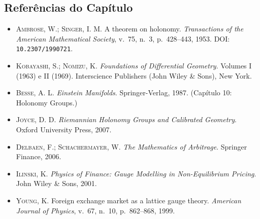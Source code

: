 \subsection*{Refer\^encias do Cap\'itulo}

\begin{itemize}
 \item \textsc{Ambrose, W.; Singer, I. M.} A theorem on holonomy. \emph{Transactions of the American Mathematical Society}, v.~75, n.~3, p.~428--443, 1953. DOI: \texttt{10.2307/1990721}.
 \item \textsc{Kobayashi, S.; Nomizu, K.} \emph{Foundations of Differential Geometry}. Volumes I (1963) e II (1969). Interscience Publishers (John Wiley \& Sons), New York.
 \item \textsc{Besse, A. L.} \emph{Einstein Manifolds}. Springer-Verlag, 1987. (Cap\'itulo 10: Holonomy Groups.)
 \item \textsc{Joyce, D. D.} \emph{Riemannian Holonomy Groups and Calibrated Geometry}. Oxford University Press, 2007.
 \item \textsc{Delbaen, F.; Schachermayer, W.} \emph{The Mathematics of Arbitrage}. Springer Finance, 2006.
 \item \textsc{Ilinski, K.} \emph{Physics of Finance: Gauge Modelling in Non-Equilibrium Pricing}. John Wiley \& Sons, 2001.
 \item \textsc{Young, K.} Foreign exchange market as a lattice gauge theory. \emph{American Journal of Physics}, v.~67, n.~10, p.~862--868, 1999.
\end{itemize}


